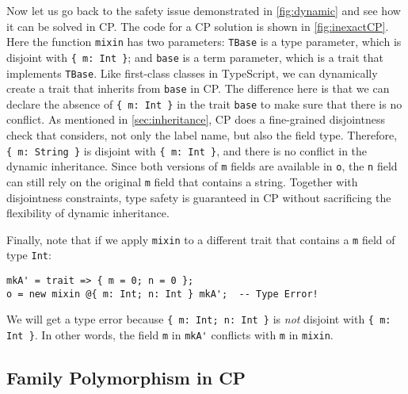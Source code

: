 \noindent
Now let us go back to the safety issue demonstrated in \autoref{fig:dynamic} and
see how it can be solved in CP. The code for a CP solution is shown in
\autoref{fig:inexactCP}. Here the function \lstinline{mixin} has two parameters:
\lstinline{TBase} is a type parameter, which is disjoint with
\lstinline|{ m: Int }|; and \lstinline{base} is a term parameter, which is a
trait that implements \lstinline{TBase}. Like first-class classes in TypeScript,
we can dynamically create a trait that inherits from \lstinline{base} in CP. The
difference here is that we can declare the absence of \lstinline|{ m: Int }| in
the trait \lstinline{base} to make sure that there is no conflict. As mentioned
in \autoref{sec:inheritance}, CP does a fine-grained disjointness check that
considers, not only the label name, but also the field type. Therefore,
\lstinline|{ m: String }| is disjoint with \lstinline|{ m: Int }|, and there is
no conflict in the dynamic inheritance. Since both versions of \lstinline{m}
fields are available in \lstinline{o}, the \lstinline{n} field can still rely on
the original \lstinline{m} field that contains a string. Together with
disjointness constraints, type safety is guaranteed in CP without sacrificing
the flexibility of dynamic inheritance.

Finally, note that if we apply \lstinline{mixin} to a different trait that
contains a \lstinline{m} field of type \lstinline{Int}:
\begin{lstlisting}
mkA' = trait => { m = 0; n = 0 };
o = new mixin @{ m: Int; n: Int } mkA';  -- Type Error!
\end{lstlisting}
We will get a type error because \lstinline|{ m: Int; n: Int }| is \emph{not}
disjoint with \lstinline|{ m: Int }|. In other words, the field \lstinline{m} in
\lstinline{mkA'} conflicts with \lstinline{m} in \lstinline{mixin}.


\subsection{Family Polymorphism in CP} \label{sec:ep}

